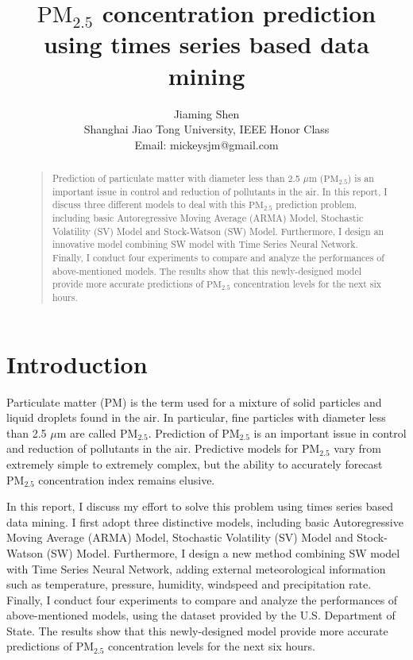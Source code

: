 \documentclass[letterpaper]{article}
\begin{document}
%
\title{$\text{PM}_{2.5}$ concentration prediction using times series based data mining}
\author{Jiaming Shen\\
Shanghai Jiao Tong University, IEEE Honor Class\\
Email: mickeysjm@gmail.com\\
}
\nocopyright
\maketitle
\begin{abstract}
\begin{quote}
Prediction of particulate matter with diameter less than 2.5 $\mu$m ($\text{PM}_{2.5}$) is an important issue in control and reduction of pollutants in the air. In this report, I discuss three different models to deal with this $\text{PM}_{2.5}$ prediction problem, including basic Autoregressive Moving Average (ARMA) Model, Stochastic Volatility (SV) Model and Stock-Watson (SW) Model. Furthermore, I design an innovative model combining SW model with Time Series Neural Network. Finally, I conduct four experiments to compare and analyze the performances of above-mentioned models. The results show that this newly-designed model provide more accurate predictions of $\text{PM}_{2.5}$ concentration levels for the next six hours.
\end{quote}
\end{abstract}

\section{Introduction}
Particulate matter (PM) is the term used for a mixture of solid particles and liquid droplets found in the air. In particular, fine particles with diameter less than 2.5 $\mu$m are called $\text{PM}_{2.5}$. Prediction of $\text{PM}_{2.5}$ is an important issue in control and reduction of pollutants in the air. Predictive models for $\text{PM}_{2.5}$ vary from extremely simple to extremely complex, but the ability to accurately forecast $\text{PM}_{2.5}$ concentration index remains elusive. 

In this report, I discuss my effort to solve this problem using times series based data mining. I first adopt three distinctive models, including basic Autoregressive Moving Average (ARMA) Model, Stochastic Volatility (SV) Model and Stock-Watson (SW) Model. Furthermore, I design a new method combining SW model with Time Series Neural Network, adding external meteorological information such as temperature, pressure, humidity, windspeed and precipitation rate. Finally, I conduct four experiments to compare and analyze the performances of above-mentioned models, using the dataset provided by the U.S. Department of State. The results show that this newly-designed model provide more accurate predictions of $\text{PM}_{2.5}$ concentration levels for the next six hours.
\end{document}
